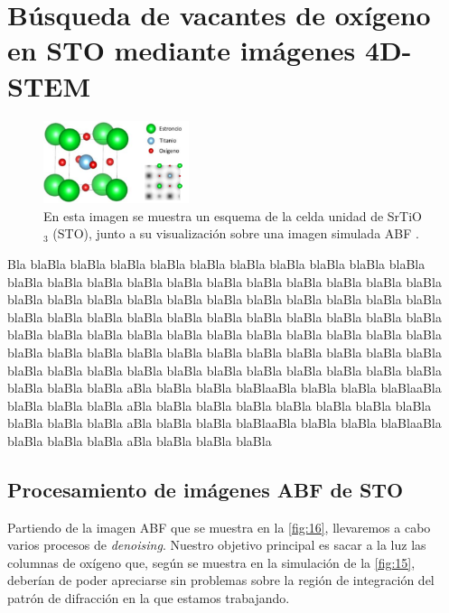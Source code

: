 \section{Búsqueda de vacantes de oxígeno en STO mediante imágenes 4D-STEM}

\begin{figure}
    \includegraphics[width=0.38\textwidth]{fig/Fig15.png}
    \caption{En esta imagen se muestra un esquema de la celda unidad de SrTiO$_3$ (STO), junto a su visualización sobre una imagen simulada ABF \cite{paquito}.}
    \label{fig:15}
\end{figure} 


Bla blaBla blaBla blaBla blaBla blaBla blaBla blaBla blaBla blaBla blaBla blaBla blaBla blaBla blaBla blaBla blaBla blaBla blaBla blaBla blaBla blaBla blaBla blaBla blaBla blaBla blaBla blaBla blaBla blaBla blaBla blaBla blaBla blaBla blaBla blaBla blaBla blaBla blaBla blaBla blaBla blaBla blaBla blaBla blaBla blaBla blaBla blaBla blaBla blaBla blaBla blaBla blaBla blaBla blaBla blaBla blaBla blaBla blaBla blaBla blaBla blaBla blaBla blaBla blaBla blaBla blaBla blaBla blaBla blaBla blaBla blaBla blaBla blaBla blaBla blaBla blaBla blaBla blaBla blaBla aBla blaBla blaBla blaBlaaBla blaBla blaBla blaBlaaBla blaBla blaBla blaBla aBla blaBla blaBla blaBla blaBla blaBla blaBla blaBla blaBla blaBla blaBla aBla blaBla blaBla blaBlaaBla blaBla blaBla blaBlaaBla blaBla blaBla blaBla aBla blaBla blaBla blaBla 



\newpage
\subsection{Procesamiento de imágenes ABF de STO}

Partiendo de la imagen ABF que se muestra en la \autoref{fig:16}, llevaremos a cabo varios procesos de \textit{denoising}. Nuestro objetivo principal es sacar a la luz las columnas de oxígeno que, según se muestra en la simulación de la \autoref{fig:15}, deberían de poder apreciarse sin problemas sobre la región de integración del patrón de difracción en la que estamos trabajando.

